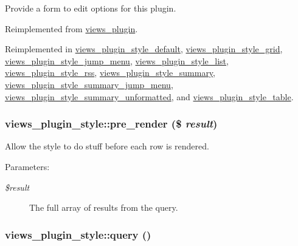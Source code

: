 Provide a form to edit options for this plugin. 

Reimplemented from \hyperlink{classviews__plugin_1aaed8da1afd9f45293a37358c159837}{views\_\-plugin}.

Reimplemented in \hyperlink{classviews__plugin__style__default_6d6eb45c613c5990a44b3071cb82b36d}{views\_\-plugin\_\-style\_\-default}, \hyperlink{classviews__plugin__style__grid_275eb0e00406028e000268ae389d17a3}{views\_\-plugin\_\-style\_\-grid}, \hyperlink{classviews__plugin__style__jump__menu_d7158f1d70c97809b44bfa0e10b11709}{views\_\-plugin\_\-style\_\-jump\_\-menu}, \hyperlink{classviews__plugin__style__list_37ec2449bb2119e4a8c3730cd458ecdb}{views\_\-plugin\_\-style\_\-list}, \hyperlink{classviews__plugin__style__rss_317b1867ddd97f969977368031e04fee}{views\_\-plugin\_\-style\_\-rss}, \hyperlink{classviews__plugin__style__summary_43826183b4d54242ae5276f40f70475f}{views\_\-plugin\_\-style\_\-summary}, \hyperlink{classviews__plugin__style__summary__jump__menu_b66730cfcd70ef23a0dbc05e80ad3d32}{views\_\-plugin\_\-style\_\-summary\_\-jump\_\-menu}, \hyperlink{classviews__plugin__style__summary__unformatted_8770285dac047bf88a2c77b2e798826d}{views\_\-plugin\_\-style\_\-summary\_\-unformatted}, and \hyperlink{classviews__plugin__style__table_732752fb9b74bdb48673cb9ff4150be9}{views\_\-plugin\_\-style\_\-table}.\hypertarget{classviews__plugin__style_9d35c181b927a52d8bf34ac629b05d20}{
\subsubsection[{pre\_\-render}]{\setlength{\rightskip}{0pt plus 5cm}views\_\-plugin\_\-style::pre\_\-render (\$ {\em result})}}
\label{classviews__plugin__style_9d35c181b927a52d8bf34ac629b05d20}


Allow the style to do stuff before each row is rendered.

\begin{Desc}
\item[Parameters:]
\begin{description}
\item[{\em \$result}]The full array of results from the query. \end{description}
\end{Desc}
\hypertarget{classviews__plugin__style_f6b601d8f42cc3d86721fcad76eaae4b}{
\subsubsection[{query}]{\setlength{\rightskip}{0pt plus 5cm}views\_\-plugin\_\-style::query ()}}
\label{classviews__plugin__style_f6b601d8f42cc3d86721fcad76eaae4b}


